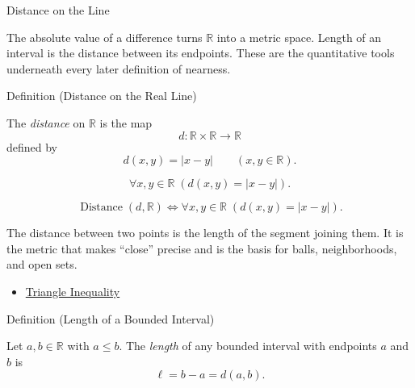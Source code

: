 \label{sec:order-distance-length}

\begin{topicbox}{Distance on the Line}
\begin{exposition}
The absolute value of a difference turns $\mathbb{R}$ into a metric space. Length of an interval is the distance between its endpoints. These are the quantitative tools underneath every later definition of nearness.
\end{exposition}
\end{topicbox}
\begin{definitionbox}{Definition (Distance on the Real Line)}
\begin{definition}
\label{def:distance-on-real-line}
The \emph{distance} on $\mathbb{R}$ is the map
\[
  d:\mathbb{R}\times\mathbb{R}\longrightarrow\mathbb{R}
\]
defined by
\[
  d(x,y)=|x-y|
  \qquad(x,y\in\mathbb{R}).
\]
\end{definition}
\end{definitionbox}
\begin{remark*}
\[
\forall x,y\in\mathbb{R}\;(d(x,y)=|x-y|).
\]
\end{remark*}
\begin{remark*}
\[
\operatorname{Distance}(d,\mathbb{R})
\Longleftrightarrow
\forall x,y\in\mathbb{R}\;(d(x,y)=|x-y|).
\]
\end{remark*}
\begin{remark*}[Interpretation]
The distance between two points is the length of the segment joining them. It is the metric that makes ``close'' precise and is the basis for balls, neighborhoods, and open sets.
\end{remark*}
\begin{dependencies}
\begin{itemize}
  \item \hyperref[thm:triangle-inequality]{Triangle Inequality}
\end{itemize}
\end{dependencies}
\begin{definitionbox}{Definition (Length of a Bounded Interval)}
\begin{definition}
\label{def:length-of-interval}
Let $a,b\in\mathbb{R}$ with $a\leq b$.  The \emph{length} of any bounded
interval with endpoints $a$ and $b$ is
\[
  \ell=b-a=d(a,b).
\]
\end{definition}
\end{definitionbox}
